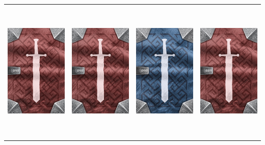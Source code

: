 \documentclass{minimal}
\begin{document}
{\begin{longtable}{llll}
\includegraphics[width=44mm,height=68mm]{./64-151/gh-090b-major-cure-potion-back.png} &
\includegraphics[width=44mm,height=68mm]{./64-151/gh-090b-major-cure-potion-back.png} &
\includegraphics[width=44mm,height=68mm]{./64-151/gh-090a-major-cure-potion-back.png} &
\includegraphics[width=44mm,height=68mm]{./64-151/gh-089b-minor-cure-potion-back.png}\\ 

\end{longtable}}
\end{document}
